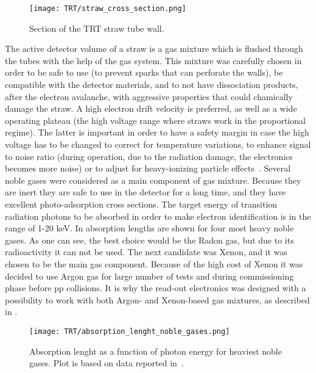 \begin{figure}
\centering
\texttt{[image: TRT/straw\_cross\_section.png]}
\caption{ 
Section of the TRT straw tube wall.
}
\label{fig:straw_wall_section}
\end{figure}

The active detector volume of a straw is a gas mixture which is flushed through the tubes with the help of the gas system.
This mixture was carefully chosen in order to be safe to use (to prevent sparks that can perforate the walls), be compatible with the detector materials, and to not have dissociation products, after the electron avalanche, with aggressive properties that could chamically damage the straw.
A high electron drift velocity is preferred, as well as a wide operating plateau (the high voltage range where straws work in the proportional regime). 
The latter is important in order to have a
safety margin in case the high voltage has to be changed to correct for temperature variations, to enhance signal to noise ratio (during operation, due to the radiation damage, the electronics becomes more noise) or to adjust for 
heavy-ionizing particle effects~\cite{Abat:2008zza}.
Several noble gases were considered as a main component of gas mixture. Because they are inert they are safe to use in the detector for a long time, and they have 
excellent photo-adsorption cross sections.
The target energy of transition radiation photons to be absorbed in order to make electron identification is in the range of 1-20 keV.
In  absorption lengths are shown for four most heavy noble gases.
As one can see, the best choice would be the Radon gas, but due to its radioactivity it can not be used.
The next candidate was Xenon, and it was chosen to be the main gas component.
Because of the high cost of Xenon it was decided to use Argon gas for large number of tests and during commissioning phase before pp collisions. It is why the read-out electronics was
designed with a possibility to work with both Argon- and Xenon-based gas mixtures, as described in .

\begin{figure}
\centering
\texttt{[image: TRT/absorption\_lenght\_noble\_gases.png]}
\caption{ 
  Absorption lenght as a function of photon energy for heaviest noble gases. Plot is based on data reported in~\cite{Hubbell:353989}.
}
\label{fig:absorption_lenght}
\end{figure}

